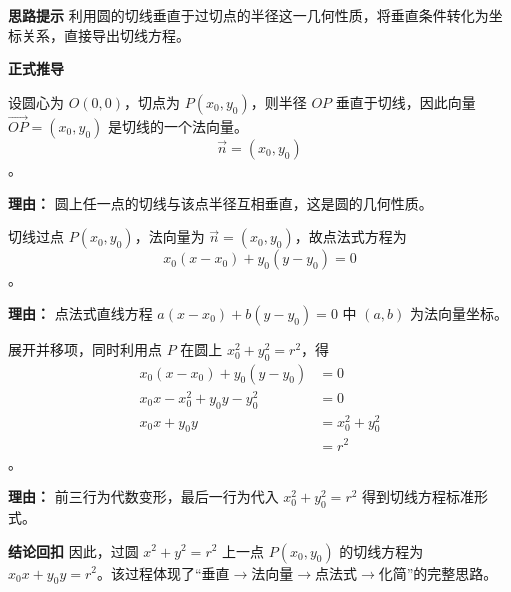 \begin{proofbox}
	\textbf{\textcolor{CProof}{思路提示}}
	利用圆的切线垂直于过切点的半径这一几何性质，将垂直条件转化为坐标关系，直接导出切线方程。

	\medskip
	\textbf{\textcolor{CProof}{正式推导}}
	\begin{description}[style=nextline, leftmargin=2.8em, labelsep=0.5em, itemsep=0.55em]
		\item[\textbf{步骤一（垂直条件）：}]
			设圆心为 $O(0,0)$，切点为 $P(x_0,y_0)$，则半径 $OP$ 垂直于切线，因此向量 $\vec{OP}=(x_0,y_0)$ 是切线的一个法向量。
			\[
				\vec{n} = (x_0, y_0)
			\]
			。
			\par\textbf{理由：} 圆上任一点的切线与该点半径互相垂直，这是圆的几何性质。
		\item[\textbf{步骤二（点法式方程）：}]
			切线过点 $P(x_0,y_0)$，法向量为 $\vec{n}=(x_0,y_0)$，故点法式方程为
			\[
				x_0(x-x_0) + y_0(y-y_0) = 0
			\]
			。
			\par\textbf{理由：} 点法式直线方程 $a(x-x_0)+b(y-y_0)=0$ 中 $(a,b)$ 为法向量坐标。
		\item[\textbf{步骤三（化简并代换）：}]
			展开并移项，同时利用点 $P$ 在圆上 $x_0^2+y_0^2=r^2$，得
			\[
				\begin{aligned}
					x_0(x-x_0)+y_0(y-y_0) &= 0 \\ x_0 x - x_0^2 + y_0 y - y_0^2 &= 0 \\ x_0 x + y_0 y &= x_0^2 + y_0^2 \\ &= r^2
			\end{aligned}
			\]
			。
			\par\textbf{理由：} 前三行为代数变形，最后一行为代入 $x_0^2+y_0^2=r^2$ 得到切线方程标准形式。
	\end{description}

	\medskip
	\textbf{\textcolor{CProof}{结论回扣}}
	因此，过圆 $x^2+y^2=r^2$ 上一点 $P(x_0,y_0)$ 的切线方程为 $x_0 x + y_0 y = r^2$。该过程体现了“垂直$\to$法向量$\to$点法式$\to$化简”的完整思路。
\end{proofbox}
